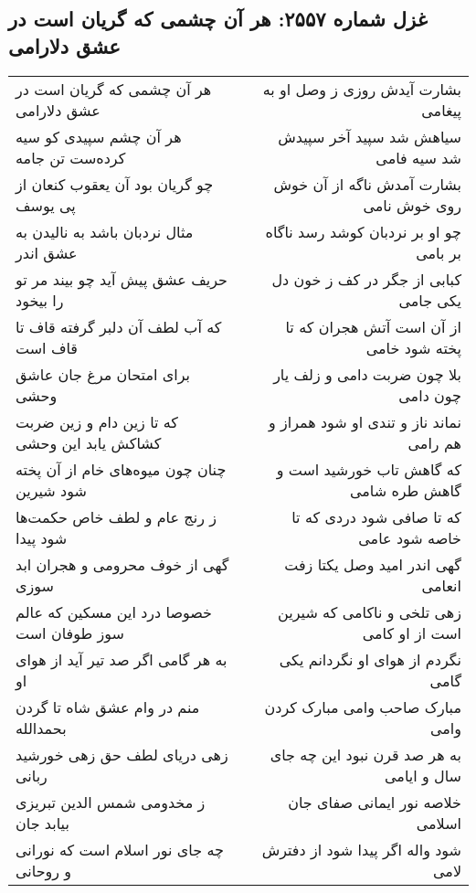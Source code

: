 \begin{center}
\section*{غزل شماره ۲۵۵۷: هر آن چشمی که گریان است در عشق دلارامی}
\label{sec:2557}
\begin{longtable}{l p{0.5cm} r}
هر آن چشمی که گریان است در عشق دلارامی
&&
بشارت آیدش روزی ز وصل او به پیغامی
\\
هر آن چشم سپیدی کو سیه کرده‌ست تن جامه
&&
سیاهش شد سپید آخر سپیدش شد سیه فامی
\\
چو گریان بود آن یعقوب کنعان از پی یوسف
&&
بشارت آمدش ناگه از آن خوش روی خوش نامی
\\
مثال نردبان باشد به نالیدن به عشق اندر
&&
چو او بر نردبان کوشد رسد ناگاه بر بامی
\\
حریف عشق پیش آید چو بیند مر تو را بیخود
&&
کبابی از جگر در کف ز خون دل یکی جامی
\\
که آب لطف آن دلبر گرفته قاف تا قاف است
&&
از آن است آتش هجران که تا پخته شود خامی
\\
برای امتحان مرغ جان عاشق وحشی
&&
بلا چون ضربت دامی و زلف یار چون دامی
\\
که تا زین دام و زین ضربت کشاکش یابد این وحشی
&&
نماند ناز و تندی او شود همراز و هم رامی
\\
چنان چون میوه‌های خام از آن پخته شود شیرین
&&
که گاهش تاب خورشید است و گاهش طره شامی
\\
ز رنج عام و لطف خاص حکمت‌ها شود پیدا
&&
که تا صافی شود دردی که تا خاصه شود عامی
\\
گهی از خوف محرومی و هجران ابد سوزی
&&
گهی اندر امید وصل یکتا زفت انعامی
\\
خصوصا درد این مسکین که عالم سوز طوفان است
&&
زهی تلخی و ناکامی که شیرین است از او کامی
\\
به هر گامی اگر صد تیر آید از هوای او
&&
نگردم از هوای او نگردانم یکی گامی
\\
منم در وام عشق شاه تا گردن بحمدالله
&&
مبارک صاحب وامی مبارک کردن وامی
\\
زهی دریای لطف حق زهی خورشید ربانی
&&
به هر صد قرن نبود این چه جای سال و ایامی
\\
ز مخدومی شمس الدین تبریزی بیابد جان
&&
خلاصه نور ایمانی صفای جان اسلامی
\\
چه جای نور اسلام است که نورانی و روحانی
&&
شود واله اگر پیدا شود از دفترش لامی
\\
\end{longtable}
\end{center}
